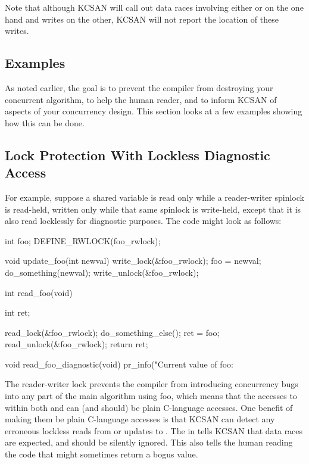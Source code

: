Note that although KCSAN will call out data races involving either
 or  on the one hand
and  writes on the other, KCSAN will not report the location
of these  writes.


\subsection{Examples}

As noted earlier, the goal is to prevent the compiler from destroying
your concurrent algorithm, to help the human reader, and to inform
KCSAN of aspects of your concurrency design.
This section looks at a few examples showing how this can be done.


\subsection{Lock Protection With Lockless Diagnostic Access}

For example, suppose a shared variable  is read only while a
reader-writer spinlock is read-held, written only while that same
spinlock is write-held, except that it is also read locklessly for
diagnostic purposes.  The code might look as follows:

\begin{VerbatimU}[samepage=false]
	int foo;
	DEFINE_RWLOCK(foo_rwlock);

	void update_foo(int newval)
	{
		write_lock(&foo_rwlock);
		foo = newval;
		do_something(newval);
		write_unlock(&foo_rwlock);
	}

	int read_foo(void)
	{
		int ret;

		read_lock(&foo_rwlock);
		do_something_else();
		ret = foo;
		read_unlock(&foo_rwlock);
		return ret;
	}

	void read_foo_diagnostic(void)
	{
		pr_info("Current value of foo: %
	}
\end{VerbatimU}

The reader-writer lock prevents the compiler from introducing concurrency
bugs into any part of the main algorithm using foo, which means that
the accesses to  within both  and 
can (and should) be plain C-language accesses.
One benefit of making them be plain C-language accesses is that KCSAN can
detect any erroneous lockless reads from or updates to .
The  in  tells KCSAN that data
races are expected, and should be silently ignored.
This  also tells the human reading the code that
 might sometimes return a bogus value.


